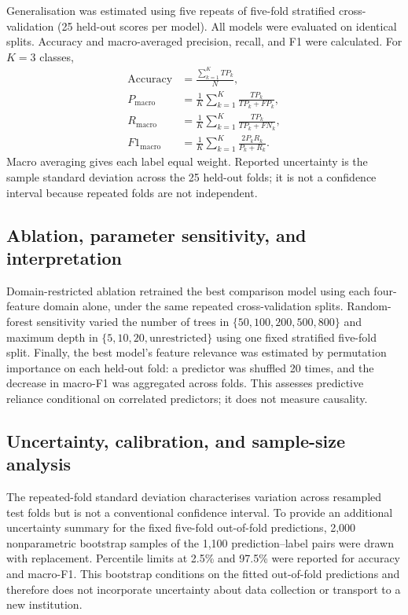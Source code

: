 \documentclass[review]{elsarticle}
\begin{document}
Generalisation was estimated using five repeats of five-fold stratified cross-validation (25 held-out scores per model). All models were evaluated on identical splits. Accuracy and macro-averaged precision, recall, and F1 were calculated. For $K=3$ classes,
\begin{align}
\mathrm{Accuracy} &= \frac{\sum_{k=1}^{K}TP_k}{N},\\
P_{\mathrm{macro}} &= \frac{1}{K}\sum_{k=1}^{K}\frac{TP_k}{TP_k+FP_k},\\
R_{\mathrm{macro}} &= \frac{1}{K}\sum_{k=1}^{K}\frac{TP_k}{TP_k+FN_k},\\
F1_{\mathrm{macro}} &= \frac{1}{K}\sum_{k=1}^{K}\frac{2P_kR_k}{P_k+R_k}.
\end{align}
Macro averaging gives each label equal weight. Reported uncertainty is the sample standard deviation across the 25 held-out folds; it is not a confidence interval because repeated folds are not independent.

\subsection{Ablation, parameter sensitivity, and interpretation}
Domain-restricted ablation retrained the best comparison model using each four-feature domain alone, under the same repeated cross-validation splits. Random-forest sensitivity varied the number of trees in $\{50,100,200,500,800\}$ and maximum depth in $\{5,10,20,\text{unrestricted}\}$ using one fixed stratified five-fold split. Finally, the best model's feature relevance was estimated by permutation importance on each held-out fold: a predictor was shuffled 20 times, and the decrease in macro-F1 was aggregated across folds. This assesses predictive reliance conditional on correlated predictors; it does not measure causality.

\subsection{Uncertainty, calibration, and sample-size analysis}
The repeated-fold standard deviation characterises variation across resampled test folds but is not a conventional confidence interval. To provide an additional uncertainty summary for the fixed five-fold out-of-fold predictions, 2,000 nonparametric bootstrap samples of the 1,100 prediction--label pairs were drawn with replacement. Percentile limits at 2.5\% and 97.5\% were reported for accuracy and macro-F1. This bootstrap conditions on the fitted out-of-fold predictions and therefore does not incorporate uncertainty about data collection or transport to a new institution.
\end{document}
